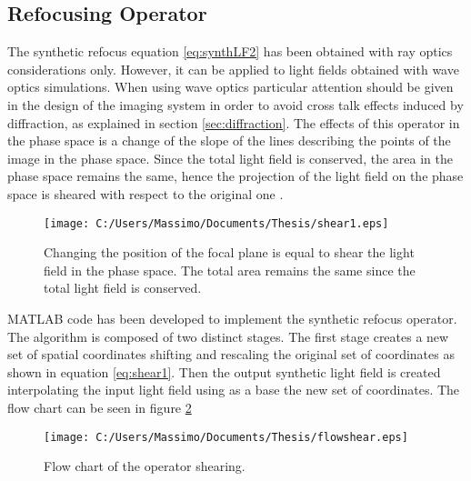 \subsection{Refocusing Operator}
The synthetic refocus equation \ref{eq:synthLF2} has been obtained with ray optics considerations only. However, it can be applied to light fields obtained with wave optics simulations. When using wave optics particular attention should be given in the design of the imaging system in order to avoid cross talk effects induced by diffraction, as explained in section \ref{sec:diffraction}. The effects of this operator in the phase space is a change of the slope of the lines describing the points of the image in the phase space. Since the total light field is conserved, the area in the phase space remains the same, hence the projection of the light field on the phase space is sheared with respect to the original one \cite{georgiev2010focused}.
\begin{figure}[H]
	\centering
	\texttt{[image: C:/Users/Massimo/Documents/Thesis/shear1.eps]}
	\caption{\label{fig:shear1} Changing the position of the focal plane is equal to shear the light field in the phase space. The total area remains the same since the total light field is conserved. }
\end{figure}
 MATLAB code has been developed to implement the synthetic refocus operator. The algorithm is composed of two distinct stages. The first stage creates a new set of spatial coordinates shifting and rescaling the original set of coordinates as shown in equation \ref{eq:shear1}. Then the output synthetic light field is created interpolating the input light field using as a base the new set of coordinates. The flow chart can be seen in figure \ref{fig:flowcharet1}

\begin{figure}[H]
	\centering
	\texttt{[image: C:/Users/Massimo/Documents/Thesis/flowshear.eps]}
	\caption{\label{fig:flowcharet1} Flow chart of the operator shearing. }
\end{figure} 
